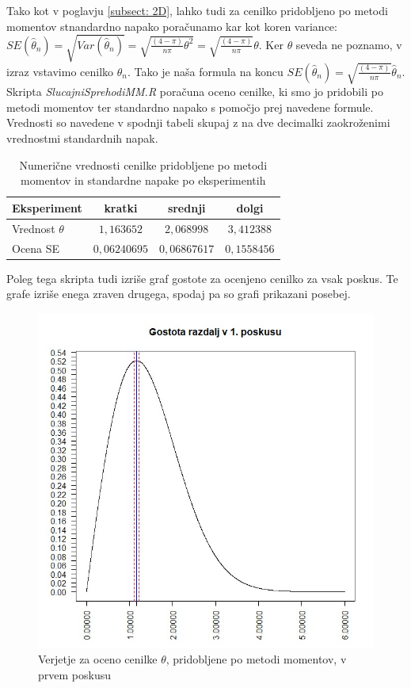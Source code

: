 \documentclass[a4paper, 10pt]{article}
\begin{document}
	Tako kot v poglavju \ref{subsect: 2D}, lahko tudi za cenilko pridobljeno po metodi momentov stnandardno napako poračunamo kar kot koren variance: $SE(\widehat{\theta}_n) = \sqrt{Var(\widehat{\theta}_n)} = \sqrt{\frac{(4-\pi)}{n\pi}\theta^2} = \sqrt{\frac{(4-\pi)}{n\pi}}\theta$. Ker $\theta$ seveda ne poznamo, v izraz vstavimo cenilko $\widehat{\theta}_n$. Tako je naša formula na koncu $SE(\widehat{\theta}_n) = \sqrt{\frac{(4-\pi)}{n\pi}}\widehat{\theta}_n$. Skripta \textit{SlucajniSprehodiMM.R} poračuna oceno cenilke, ki smo jo pridobili po metodi momentov ter standardno napako s pomočjo prej navedene formule. Vrednosti so navedene v spodnji tabeli skupaj z na dve decimalki zaokroženimi vrednostmi standardnih napak.
	
	\begin{table}[h!]
		\label{tab: mmse}
		\centering
		\begin{tabular}{|l|c|c|c|}
			\hline
			Eksperiment & kratki & srednji & dolgi \\ \hline
			Vrednost $\theta$ & $1{,}163652$ & $2{,}068998$ & $3{,}412388$ \\ \hline
			Ocena SE & $0{,}06240695$ & $0{,}06867617$ & $0{,}1558456$ \\ \hline
		\end{tabular}
		\caption{Numerične vrednosti cenilke pridobljene po metodi momentov in standardne napake po eksperimentih}
	\end{table}

	Poleg tega skripta tudi izriše graf gostote za ocenjeno cenilko za vsak poskus. Te grafe izriše enega zraven drugega, spodaj pa so grafi prikazani posebej.
	
	\begin{figure}[h!]
		\label{fig: 2Eplot1}
		\centering
		\includegraphics[scale = 0.45]{VerjetjeMM1}
		\caption{Verjetje za oceno cenilke $\theta$, pridobljene po metodi momentov, v prvem poskusu}
	\end{figure}
	
\end{document}
